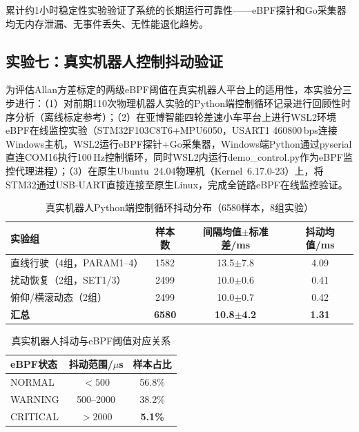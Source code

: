 \documentclass{rjthesis}
\begin{document}
累计约1小时稳定性实验验证了系统的长期运行可靠性——eBPF探针和Go采集器均无内存泄漏、无事件丢失、无性能退化趋势。

\subsection{实验七：真实机器人控制抖动验证}

为评估Allan方差标定的两级eBPF阈值在真实机器人平台上的适用性，本实验分三步进行：（1）对前期110次物理机器人实验的Python端控制循环记录进行回顾性时序分析（离线标定参考）；（2）在亚博智能四轮差速小车平台上进行WSL2环境eBPF在线监控实验（STM32F103C8T6+MPU6050，USART1 460800\,bps连接Windows主机，WSL2运行eBPF探针+Go采集器，Windows端Python通过pyserial直连COM16执行100\,Hz控制循环，同时WSL2内运行demo\_control.py作为eBPF监控代理进程）；（3）在原生Ubuntu~24.04物理机（Kernel~6.17.0-23）上，将STM32通过USB-UART直接连接至原生Linux，完成全链路eBPF在线监控验证。

\begin{table}[h]
    \centering
    \caption{真实机器人Python端控制循环抖动分布（6580样本，8组实验）}
    \label{tab:real_jitter}
    \small
    \begin{tabular}{l c c c}
        \toprule
        \textbf{实验组} & \textbf{样本数} & \textbf{间隔均值$\pm$标准差/ms} & \textbf{抖动均值/ms} \\
        \midrule
        直线行驶（4组，PARAM1--4） & 1582 & 13.5$\pm$7.8 & 4.09 \\
        扰动恢复（2组，SET1/3） & 2499 & 10.0$\pm$0.6 & 0.41 \\
        俯仰/横滚动态（2组） & 2499 & 10.0$\pm$0.7 & 0.42 \\
        \midrule
        \textbf{汇总} & \textbf{6580} & \textbf{10.8$\pm$4.2} & \textbf{1.31} \\
        \bottomrule
    \end{tabular}
\end{table}

\begin{table}[h]
    \centering
    \caption{真实机器人抖动与eBPF阈值对应关系}
    \label{tab:jitter_threshold}
    \small
    \begin{tabular}{l c c}
        \toprule
        \textbf{eBPF状态} & \textbf{抖动范围/$\mu$s} & \textbf{样本占比} \\
        \midrule
        NORMAL & $<500$ & 56.8\% \\
        WARNING & 500--2000 & 38.2\% \\
        CRITICAL & $>2000$ & \textbf{5.1\%} \\
        \bottomrule
    \end{tabular}
\end{table}
\end{document}
